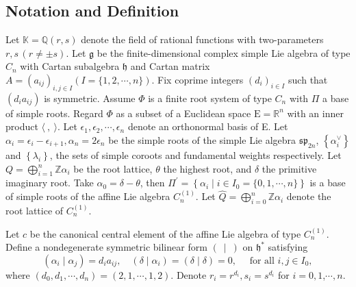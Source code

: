 \documentclass[10pt,a4paper]{amsart}
\numberwithin{equation}{section}
\begin{document}
	\subsection{Notation and Definition}
	Let $\mathbb{K}=\mathbb{Q}\left(r, s\right)$ denote the field of rational functions with two-parameters $r, s \, (r \neq \pm s)$. Let $\mathfrak{g}$ be the finite-dimensional complex simple Lie algebra of type $C_n$ with Cartan subalgebra $\mathfrak{h}$ and Cartan matrix $A=\left(a_{i j}\right)_{i, j \in I}(I=\{1,2, \cdots, n\})$. Fix coprime
	integers $\left(d_i\right)_{i \in I}$ such that $\left(d_i a_{i j}\right)$  is symmetric. Assume $\Phi$ is a finite root system of type $C_n$ with $\Pi$ a base of simple roots. Regard $\Phi$ as a subset of a Euclidean space $\mathrm{E}=$$\mathbb{R}^n$ with an inner product $\langle\   , \ \rangle$. Let $\epsilon_1, \epsilon_2, \cdots, \epsilon_n$ denote an orthonormal basis of E. Let $\alpha_i=\epsilon_i-\epsilon_{i+1}, \alpha_n=2 \epsilon_n$ be the simple roots of the simple Lie algebra $\mathfrak{s p}_{2 n}$, $\left\{\alpha_i^{\vee}\right\}$ and $\left\{\lambda_i\right\}$, the sets of simple coroots and fundamental weights respectively. Let $Q=\bigoplus_{i=1}^n \mathbb{Z} \alpha_i$ be the root lattice, $\theta$ the highest root, and $\delta$ the primitive imaginary root. Take $\alpha_0=\delta-\theta$, then $\Pi^{\prime}=\left\{\alpha_i \mid i \in I_0=\{0,1, \cdots, n\}\right\}$ is a base of simple roots of the affine Lie algebra $C_n^{(1)}$. Let $\widehat{Q}=\bigoplus_{i=0}^n \mathbb{Z} \alpha_i$ denote the root lattice of $C_n^{(1)}$.
	
	Let $c$ be the canonical central element of the affine Lie algebra of type $C_n^{(1)}$. Define a nondegenerate symmetric bilinear form $(\ \mid \ )$ on $\mathfrak{h}^*$ satisfying
	$$
	\left(\alpha_i \mid \alpha_j\right)=d_i a_{i j}, \quad\left(\delta \mid \alpha_i\right)=(\delta \mid \delta)=0, \quad \text { for all } i, j \in I_0,
	$$
	where $\left(d_0, d_1, \cdots, d_n\right)=\left(2,1 , \cdots,1 , 2\right)$. Denote $r_i=r^{d_i}, s_i=s^{d_i}$ for $i=0,1$,$\cdots, n$.
	
\end{document}
